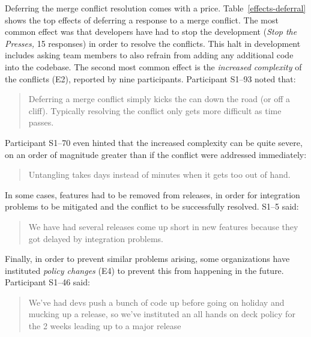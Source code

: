 
Deferring the merge conflict resolution comes with a price.
Table~\ref{effects-deferral} shows the top effects of deferring a response to a merge conflict.
The most common effect was that developers have had to stop the development (\emph{Stop the Presses,} 15 responses) in order to resolve the conflicts.
This halt in development includes asking team members to also refrain from adding any additional code into the codebase.
The second most common effect is the \textit{increased complexity} of the conflicts (E2), reported by nine participants.
Participant S1--93 noted that:
\begin{quotation}
	Deferring a merge conflict simply kicks the can down the road (or off a cliff). Typically resolving the conflict only gets more difficult as time passes.
\end{quotation}
Participant S1--70 even hinted that the increased complexity can be quite severe, on an order of magnitude greater than if the conflict were addressed immediately:
\begin{quotation}
	Untangling takes days instead of minutes when it gets too out of hand.
\end{quotation}
In some cases, features had to be removed from releases, in order for integration problems to be mitigated and the conflict to be successfully resolved. S1--5 said:
\begin{quotation}
	We have had several releases come up short in new features because they got delayed by integration problems.
\end{quotation}
Finally, in order to prevent similar problems arising, some organizations have instituted \textit{policy changes} (E4) to prevent this from happening in the future. Participant S1--46 said:
\begin{quotation}
	We've had devs push a bunch of code up before going on holiday and mucking up a release, so we've instituted an all hands on deck policy for the 2 weeks leading up to a major release
\end{quotation}

